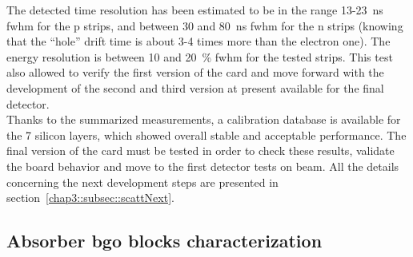 The detected time resolution has been estimated to be in the range 13-23~ns \gls{fwhm} for the p strips, and between 30 and 80~ns \gls{fwhm} for the n strips (knowing that the \enquote{hole} drift time is about 3-4 times more than the electron one). The energy resolution is between 10 and 20~\% \gls{fwhm} for the tested strips. This test also allowed to verify the first version of the card and move forward with the development of the second and third version at present available for the final detector.\\
Thanks to the summarized measurements, a calibration database is available for the 7 silicon layers, which showed overall stable and acceptable performance. The final version of the card must be tested in order to check these results, validate the board behavior and move to the first detector tests on beam. All the details concerning the next development steps are presented in section~\ref{chap3::subsec::scattNext}.    


\subsection{Absorber \gls{bgo} blocks characterization}\label{chap3::subsec::absBGOchar}

